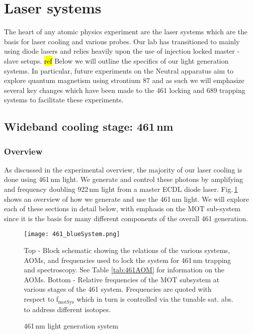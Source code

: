\section{Laser systems}\label{sec:laser_systems}
\setcounter{footnote}{0}
The heart of any atomic physics experiment are the laser systems which are the basis for laser cooling and various probes.
Our lab has transitioned to mainly using diode lasers and relies heavily upon the use of injection locked master - slave setups. \hl{ref}
Below we will outline the specifics of our light generation systems.
In particular, future experiments on the Neutral apparatus aim to explore quantum magnetism using strontium 87 and as such we will emphasize several key changes which have been made to the 461 locking and 689 trapping systems to facilitate these experiments.

\subsection{Wideband cooling stage: 461\,nm} \label{ssec:461sys}
\subsubsection{Overview}
As discussed in the experimental overview, the majority of our laser cooling is done using 461\,nm light. 
We generate and control these photons by amplifying and frequency doubling 922\,nm light from a master ECDL diode laser. 
Fig.\,\ref{fig:461blockSys} shows an overview of how we generate and use the 461\,nm light.
We will explore each of these sections in detail below, with emphasis on the MOT sub-system since it is the basis for many different components of the overall 461 generation.
	\begin{figure}
		\centerline{
		\texttt{[image: 461\_blueSystem.png]}}
		\caption{461\,nm light generation system}{Top - Block schematic showing the relations of the various systems, AOMs, and frequencies used to lock the system for 461\,nm trapping and spectroscopy. See Table \ref{tab:461AOM} for information on the AOMs. Bottom - Relative frequencies of the MOT subsystem at various stages of the 461 system. Frequencies are quoted with respect to f$_{\text{motSys}}$ which in turn is controlled via the tunable sat. abs. to address different isotopes.}
		\label{fig:461blockSys}
	\end{figure} 

